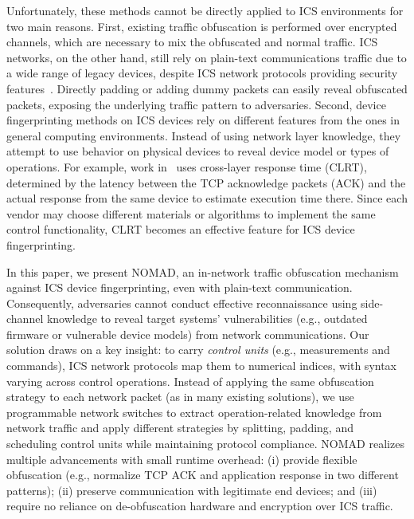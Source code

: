 \documentclass[conference]{IEEEtran}
\begin{document}
Unfortunately, these methods cannot be directly applied to ICS environments for two main reasons. 
First, existing traffic obfuscation is performed over encrypted channels, which are necessary to mix the obfuscated and normal traffic. ICS networks, on the other hand, still rely on plain-text communications traffic due to a wide range of legacy devices, despite ICS network protocols providing security features~\cite{dnp3std}. Directly padding or adding dummy packets can easily reveal obfuscated packets, exposing the underlying traffic pattern to adversaries. 
Second, device fingerprinting methods on ICS devices rely on different features from the ones in general computing environments. Instead of using network layer knowledge, they attempt to use behavior on physical devices to reveal device model or types of operations. For example, work in~\cite{formby2016} uses cross-layer response time (CLRT), determined by the latency between the TCP acknowledge packets (ACK) and the actual response from the same device to estimate execution time there. Since each vendor may choose different materials or algorithms to implement the same control functionality, CLRT becomes an effective feature for ICS device fingerprinting. 


In this paper, we present NOMAD, an in-network traffic obfuscation mechanism against ICS device fingerprinting, even with plain-text communication. Consequently, adversaries cannot conduct effective reconnaissance using side-channel knowledge to reveal target systems' vulnerabilities (e.g., outdated firmware or vulnerable device models) from network communications. Our solution draws on a key insight: to carry \textit{control units} (e.g., measurements and commands), ICS network protocols map them to numerical indices, with syntax varying across control operations. %
Instead of applying the same obfuscation strategy to each network packet (as in many existing solutions), we use programmable network switches to extract operation-related knowledge from network traffic and apply different strategies by splitting, padding, and scheduling control units while maintaining protocol compliance. 
NOMAD realizes multiple advancements with small runtime overhead: (i) provide flexible obfuscation (e.g., normalize TCP ACK and application response in two different patterns); (ii) preserve communication with legitimate end devices; and (iii) require no reliance on de-obfuscation hardware and encryption over ICS traffic. 
\end{document}
